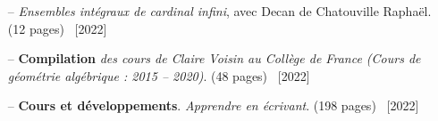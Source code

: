 \documentclass[10pt]{article}
\newcommand\tab[1][1cm]{\hspace*{#1}}
\begin{document}
		\begin{itemize}[itemsep = -0.75 mm]
			\item[--] \noindent \textit{Ensembles intégraux de cardinal infini}, avec Decan de Chatouville Raphaël. (12 pages)  \hfill {\ \small [2022]}
			\item[--] \noindent \textbf{Compilation} \textit{des cours de Claire Voisin au Collège de France (Cours de géométrie algébrique : 2015 -- 2020)}. (48 pages)  \hfill {\ \small [2022]}
			\item[--] \noindent \textbf{Cours et développements}. \textit{Apprendre en écrivant}. (198 pages)  \hfill {\ \small [2022]}

\end{itemize}
\end{document}
